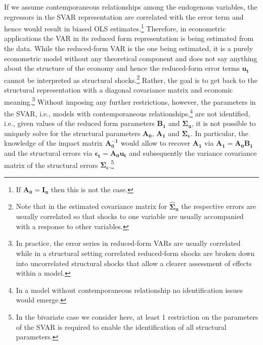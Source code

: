 \documentclass[a4paper,11pt,listof=nochaptergap,oneside,pointednumbers,bibtotoc,bigheadings,liststotoc,hidelinks]{scrbook}
\theoremstyle{mysatz}
\theoremstyle{mydefinition}
\theoremstyle{mytheorem}
\theoremstyle{mybemerkung}
\newcommand{\vect}[1]{\boldsymbol{\mathbf{#1}}}
\begin{document}
If we assume contemporaneous relationships among the endogenous variables, the regressors in the SVAR representation are correlated with the error term and hence would result in biased OLS estimates.\footnote{If $\vect{A_0} = \vect{I_n}$ then this is not the case.} Therefore, in econometric applications the VAR in its reduced form representation is being estimated from the data. While the reduced-form VAR is the one being estimated, it is a purely econometric model without any theoretical component and does not say anything about the structure of the economy and hence the reduced-form error terms $\vect{u_t}$ cannot be interpreted as structural shocks.\footnote{Note that in the estimated covariance matrix for $\vect{\hat{\Sigma}_u}$ the respective errors are usually correlated so that shocks to one variable are usually accompanied with a response to other variables.} Rather, the goal is to get back to the structural representation with a diagonal covariance matrix and economic meaning.\footnote{In practice, the error series in reduced-form VARs are usually correlated while in a structural setting correlated reduced-form shocks are broken down into uncorrelated structural shocks that allow a clearer assessment of effects within a model.} Without imposing any further restrictions, however, the parameters in the SVAR, i.e., models with contemporaneous relationships,\footnote{In a model without contemporaneous relationship no identification issues would emerge.} are not identified, i.e., given values of the reduced form parameters $\vect{B_1}$ and $\vect{\Sigma_u}$, it is not possible to uniquely solve for the structural parameters $\vect{A_0}$, $\vect{A_1}$ and $\vect{\Sigma_\epsilon}$. In particular, the knowledge of the impact matrix $\vect{A_0^{-1}}$ would allow to recover $\vect{A_1}$ via $\vect{A_1} = \vect{A_0}\vect{B_1}$ and the structural errors via $\vect{\epsilon_t} = \vect{A_0}\vect{u_t}$ and subsequently the variance covariance matrix of the structural errors $\vect{\Sigma_\epsilon}$.\footnote{In the bivariate case we consider here, at least 1 restriction on the parameters of the SVAR is required to enable the identification of all structural parameters. }
\end{document}
